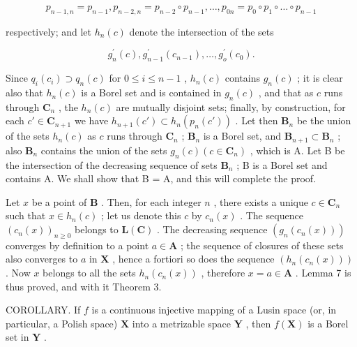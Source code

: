 \[
p _ {n - 1, n} = p _ {n - 1}, p _ {n - 2, n} = p _ {n - 2} \circ p _ {n - 1}, \dots , p _ {0 n} = p _ {0} \circ p _ {1} \circ \dots \circ p _ {n - 1}
\]

respectively; and let \(h_n(c)\) denote the intersection of the sets

\[
g _ {n} ^ {\prime} (c), g _ {n - 1} ^ {\prime} \left(c _ {n - 1}\right), \dots , g _ {o} ^ {\prime} \left(c _ {0}\right).
\]

Since \(q_{i}(c_{i}) \supset q_{n}(c)\) for \(0 \leqslant i \leqslant n - 1\) , \(h_{n}(c)\) contains \(g_{n}(c)\) ; it is clear also that \(h_{n}(c)\) is a Borel set and is contained in \(g_{n}(c)\) , and that as \(c\) runs through \(\mathbf{C}_{n}\) , the \(h_{n}(c)\) are mutually disjoint sets; finally, by construction, for each \(c' \in \mathbf{C}_{n+1}\) we have \(h_{n+1}(c') \subset h_n(p_n(c'))\) . Let then \(\mathbf{B}_n\) be the union of the sets \(h_n(c)\) as \(c\) runs through \(\mathbf{C}_n\) ; \(\mathbf{B}_n\) is a Borel set, and \(\mathbf{B}_{n+1} \subset \mathbf{B}_n\) ; also \(\mathbf{B}_n\) contains the union of the sets \(g_n(c) (c \in \mathbf{C}_n)\) , which is A. Let B be the intersection of the decreasing sequence of sets \(\mathbf{B}_n\) ; B is a Borel set and contains A. We shall show that B = A, and this will complete the proof.

Let \(x\) be a point of \(\mathbf{B}\) . Then, for each integer \(n\) , there exists a unique \(c \in \mathbf{C}_n\) such that \(x \in h_n(c)\) ; let us denote this \(c\) by \(c_n(x)\) . The sequence \((c_n(x))_{n \geqslant 0}\) belongs to \(\mathbf{L}(\mathbf{C})\) . The decreasing sequence \((g_n(c_n(x)))\) converges by definition to a point \(a \in \mathbf{A}\) ; the sequence of closures of these sets also converges to \(a\) in \(\mathbf{X}\) , hence a fortiori so does the sequence \((h_n(c_n(x)))\) . Now \(x\) belongs to all the sets \(h_n(c_n(x))\) , therefore \(x = a \in \mathbf{A}\) . Lemma 7 is thus proved, and with it Theorem 3.

COROLLARY. If \(f\) is a continuous injective mapping of a Lusin space (or, in particular, a Polish space) \(\mathbf{X}\) into a metrizable space \(\mathbf{Y}\) , then \(f(\mathbf{X})\) is a Borel set in \(\mathbf{Y}\) .

